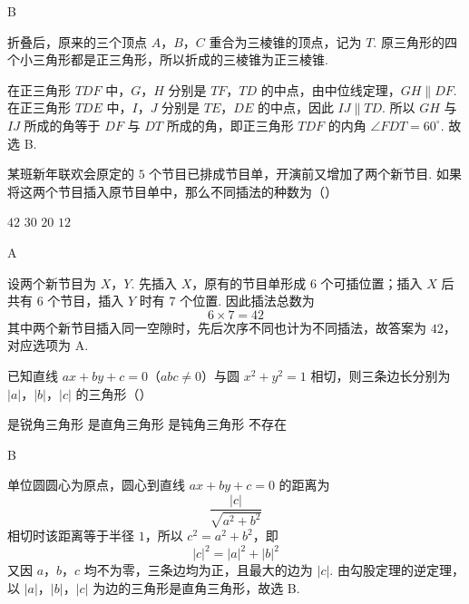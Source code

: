 \begin{answer}
B
\end{answer}

\begin{solution}
折叠后，原来的三个顶点 \(A\)，\(B\)，\(C\) 重合为三棱锥的顶点，记为 \(T\). 原三角形的四个小三角形都是正三角形，所以折成的三棱锥为正三棱锥.

在正三角形 \(TDF\) 中，\(G\)，\(H\) 分别是 \(TF\)，\(TD\) 的中点，由中位线定理，\(GH\parallel DF\). 在正三角形 \(TDE\) 中，\(I\)，\(J\) 分别是 \(TE\)，\(DE\) 的中点，因此 \(IJ\parallel TD\). 所以 \(GH\) 与 \(IJ\) 所成的角等于 \(DF\) 与 \(DT\) 所成的角，即正三角形 \(TDF\) 的内角 \(\angle FDT=60^{\circ}\). 故选 B.
\end{solution}

\begin{problem}
某班新年联欢会原定的 \(5\text{ 个}\)节目已排成节目单，开演前又增加了两个新节目. 如果将这两个节目插入原节目单中，那么不同插法的种数为（\quad）

\choices
    {\(42\)}
    {\(30\)}
    {\(20\)}
    {\(12\)}
\end{problem}

\begin{answer}
A
\end{answer}

\begin{solution}
设两个新节目为 \(X\)，\(Y\). 先插入 \(X\)，原有的节目单形成 \(6\) 个可插位置；插入 \(X\) 后共有 \(6\) 个节目，插入 \(Y\) 时有 \(7\) 个位置. 因此插法总数为
\[
6\times7=42
\]
其中两个新节目插入同一空隙时，先后次序不同也计为不同插法，故答案为 \(42\)，对应选项为 A.
\end{solution}

\begin{problem}
已知直线 \(ax+by+c=0\)（\(abc\ne0\)）与圆 \(x^{2}+y^{2}=1\) 相切，则三条边长分别为 \(|a|\)，\(|b|\)，\(|c|\) 的三角形（\quad）

\choices
    {是锐角三角形}
    {是直角三角形}
    {是钝角三角形}
    {不存在}
\end{problem}

\begin{answer}
B
\end{answer}

\begin{solution}
单位圆圆心为原点，圆心到直线 \(ax+by+c=0\) 的距离为
\[
\dfrac{|c|}{\sqrt{a^{2}+b^{2}}}
\]
相切时该距离等于半径 \(1\)，所以 \(c^{2}=a^{2}+b^{2}\)，即
\[
|c|^{2}=|a|^{2}+|b|^{2}
\]
又因 \(a\)，\(b\)，\(c\) 均不为零，三条边均为正，且最大的边为 \(|c|\). 由勾股定理的逆定理，以 \(|a|\)，\(|b|\)，\(|c|\) 为边的三角形是直角三角形，故选 B.
\end{solution}

